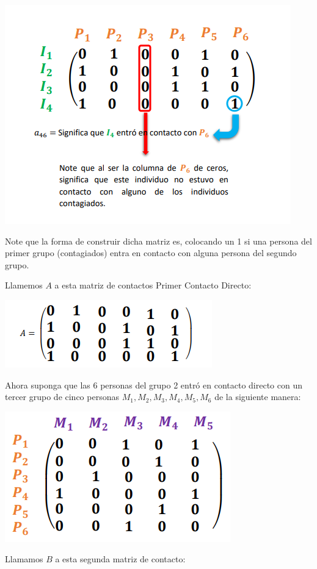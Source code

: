\documentclass[]{article}
\begin{document}
\includegraphics{matriz_contagio.png}

Note que la forma de construir dicha matriz es, colocando un 1 si una
persona del primer grupo (contagiados) entra en contacto con alguna
persona del segundo grupo.

Llamemos \(A\) a esta matriz de contactos Primer Contacto Directo:

\includegraphics{matriz_a.png}

Ahora suponga que las 6 personas del grupo 2 entró en contacto directo
con un tercer grupo de cinco personas
\(M_{1}, M_{2}, M_{3}, M_{4}, M_{5}, M_{6}\) de la siguiente manera:

\includegraphics{matriz_contagio_indirecto.png}

Llamamos \(B\) a esta segunda matriz de contacto:
\end{document}
